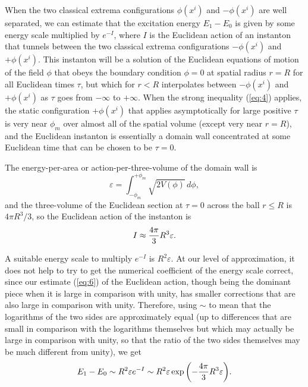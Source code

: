 \documentclass[a4paper,12pt]{article}
\begin{document}
	When the two classical extrema configurations
$\phi(x^i)$ and $-\phi(x^i)$ are well separated,
we can estimate that the excitation energy $E_1 - E_0$
is given by some energy scale multiplied by $e^{-I}$,
where $I$ is the Euclidean action of an instanton
that tunnels between the two classical extrema
configurations $-\phi(x^i)$ and $+\phi(x^i)$.
This instanton will be a solution of the Euclidean
equations of motion of the field $\phi$ that
obeys the boundary condition $\phi = 0$ at
spatial radius $r = R$ for all Euclidean times $\tau$,
but which for $r < R$ interpolates between
$-\phi(x^i)$ and $+\phi(x^i)$ as $\tau$
goes from $-\infty$ to $+\infty$.
When the strong inequality (\ref{eq:4}) applies,
the static configuration $+\phi(x^i)$
that applies asymptotically for large positive $\tau$
is very near $\phi_m$ over almost all of the
spatial volume (except very near $r = R$), and
the Euclidean instanton is essentially a domain
wall concentrated at some Euclidean time that can
be chosen to be $\tau = 0$.

	The energy-per-area or action-per-three-volume
of the domain wall is
 \begin{equation}
 \varepsilon=\int_{-\phi_m}^{+\phi_m}\sqrt{2V(\phi)}\,d\phi,
 \label{eq:5}
 \end{equation}
and the three-volume of the Euclidean section at
$\tau = 0$ across the ball $r \leq R$ is $4\pi R^3/3$,
so the Euclidean action of the instanton is
 \begin{equation}
 I \approx {4\pi\over 3} R^3 \varepsilon.
 \label{eq:6}
 \end{equation}

	A suitable energy scale to multiply $e^{-I}$
is $R^2 \varepsilon$.  At our level of approximation,
it does not help to try to get the numerical
coefficient of the energy scale correct,
since our estimate (\ref{eq:6}) of the Euclidean action,
though being the dominant piece when it is large
in comparison with unity, has smaller corrections
that are also large in comparison with unity.
Therefore, using $\sim$ to mean that the logarithms
of the two sides are approximately equal
(up to differences that are small in comparison
with the logarithms themselves but which may actually
be large in comparison with unity,
so that the ratio of the two sides themselves
may be much different from unity), we get 
 \begin{equation}
 E_1-E_0 \sim R^2 \varepsilon e^{-I}
     \sim R^2 \varepsilon
        \exp{\left(-{4\pi\over 3}R^3\varepsilon\right)}.
 \label{eq:7}
 \end{equation}
\end{document}
